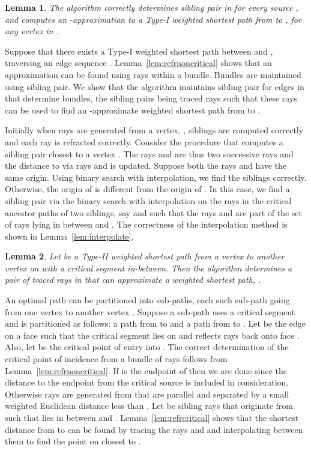 \documentclass[11pt]{article}
\newtheorem{lemma}{Lemma}[section]
\newenvironment{proof}{\par\noindent{\bf Proof:}}{\mbox{}\hfill\\}
\begin{document}
\begin{lemma}
\label{lem:type1find}
The algorithm correctly determines sibling pair in  for every source , and computes an -approximation to a Type-I weighted shortest path from  to , for any vertex  in .
\end{lemma}
\begin{proof}
Suppose that there exists a Type-I weighted shortest path between  and , traversing an edge sequence .
Lemma~\ref{lem:refrnoncritical} shows that an  approximation can be found using rays within
a bundle. Bundles are maintained using sibling pair.
We show that the algorithm maintains sibling pair for edges in  that determine bundles, the sibling pairs being traced rays such that these rays can be used to find an -approximate weighted shortest path from  to .

Initially when rays are generated from a vertex, , siblings are computed correctly and each ray is refracted correctly.
Consider the procedure that computes a sibling pair  closest to a vertex .
The rays  and  are thus two successive rays and the distance to  via rays  and  is updated.
Suppose both the rays  and  have the same origin.
Using binary search with interpolation, we find the siblings correctly.
Otherwise, the origin of  is different from the origin of .
In this case, we find a sibling pair via the binary search with interpolation on the rays in the critical ancestor paths of two siblings, say  and  such that the rays  and   are part of the set of rays lying in between  and .
The correctness of the interpolation method is shown in Lemma~\ref{lem:interpolate}.
\end{proof}

\begin{lemma}
\label{lem:refrcritical-find}
Let  be a Type-II weighted shortest path from a vertex  to another vertex  on  with a critical segment  in-between.
Then the algorithm determines a pair of traced rays  in  that can approximate a weighted shortest path, . 
\end{lemma}
\begin{proof}
An optimal path  can be partitioned into sub-paths, each such sub-path going from one vertex  to another vertex . 
Suppose a sub-path uses a critical segment  and is partitioned as follows: a path  from  to  and a path  from  to .
Let  be the edge on a face  such that the critical segment  lies  on  and reflects rays back onto face . 
Also, let  be the critical point of entry into .
The correct determination of the critical point of incidence from a bundle of rays follows from
Lemma~\ref{lem:refrnoncritical}.
If  is the endpoint of  then we are done since the distance to the endpoint from the critical source is included in consideration.
Otherwise rays are generated from   that are parallel and separated by a small weighted Euclidean distance  less than .
Let  be sibling rays that originate from  such that  lies in between  and .
Lemma~\ref{lem:refrcritical} shows that the shortest distance from  to  can
be found by tracing the rays  and  and interpolating between them to find the  point
on  closest to .
\end{proof}
\end{document}
